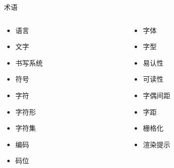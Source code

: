 \begin{frame}{术语}
\footnotesize
\begin{columns}[t]
\begin{column}{0.48\textwidth}
  \begin{itemize}
    \item 语言
    \item 文字
    \item 书写系统
  \end{itemize}
  \begin{itemize}
    \item 符号
    \item 字符
    \item 字符形
  \end{itemize}
  \begin{itemize}
    \item 字符集
    \item 编码
    \item 码位
  \end{itemize}
\end{column}
\begin{column}{0.48\textwidth}
  \begin{itemize}
    \item 字体
    \item 字型
  \end{itemize}
  \begin{itemize}
    \item 易认性
    \item 可读性
  \end{itemize}
  \begin{itemize}
    \item 字偶间距
    \item 字距
  \end{itemize}
  \begin{itemize}
    \item 栅格化
    \item 渲染提示
  \end{itemize}
\end{column}
\end{columns}
\end{frame}

